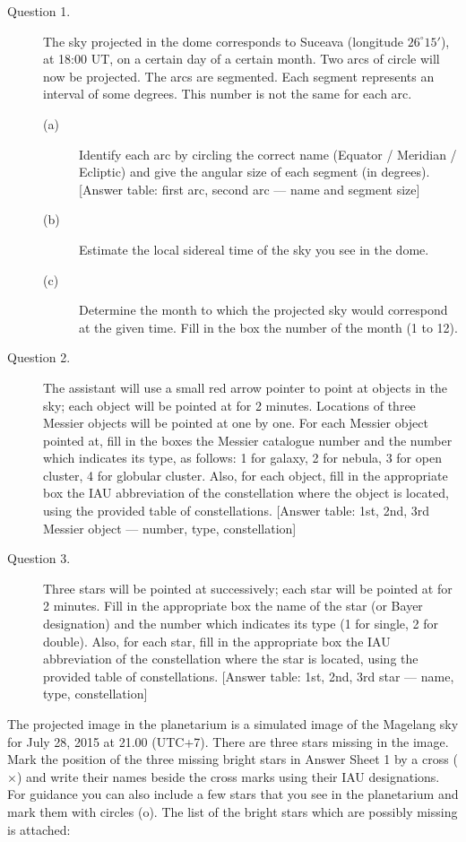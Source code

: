 \begin{description}
\item[Question 1.] The sky projected in the dome corresponds to Suceava
  (longitude $26^\circ 15'$), at 18:00 UT, on a certain day of a certain
  month. Two arcs of circle will now be projected. The arcs are segmented.
  Each segment represents an interval of some degrees. This number is not
  the same for each arc.
  \begin{description}
  \item[(a)] Identify each arc by circling the correct name (Equator /
    Meridian / Ecliptic) and give the angular size of each segment (in
    degrees).
    [Answer table: first arc, second arc --- name and segment size]
  \item[(b)] Estimate the local sidereal time of the sky you see in the
    dome.
  \item[(c)] Determine the month to which the projected sky would correspond
    at the given time. Fill in the box the number of the month (1 to 12).
  \end{description}
\item[Question 2.] The assistant will use a small red arrow pointer to point
  at objects in the sky; each object will be pointed at for 2 minutes.
  Locations of three Messier objects will be pointed at one by one. For each
  Messier object pointed at, fill in the boxes the Messier catalogue number
  and the number which indicates its type, as follows: 1 for galaxy, 2 for
  nebula, 3 for open cluster, 4 for globular cluster. Also, for each object,
  fill in the appropriate box the IAU abbreviation of the constellation
  where the object is located, using the provided table of constellations.
  [Answer table: 1st, 2nd, 3rd Messier object --- number, type,
  constellation]
\item[Question 3.] Three stars will be pointed at successively; each star
  will be pointed at for 2 minutes. Fill in the appropriate box the name of
  the star (or Bayer designation) and the number which indicates its type
  (1 for single, 2 for double). Also, for each star, fill in the appropriate
  box the IAU abbreviation of the constellation where the star is located,
  using the provided table of constellations.
  [Answer table: 1st, 2nd, 3rd star --- name, type, constellation]
\end{description}

The projected image in the planetarium is a simulated image of the Magelang
sky for July 28, 2015 at 21.00 (UTC+7). There are three stars missing in the
image. Mark the position of the three missing bright stars in Answer Sheet 1
by a cross ($\times$) and write their names beside the cross marks using
their IAU designations. For guidance you can also include a few stars that
you see in the planetarium and mark them with circles (o). The list of the
bright stars which are possibly missing is attached:

